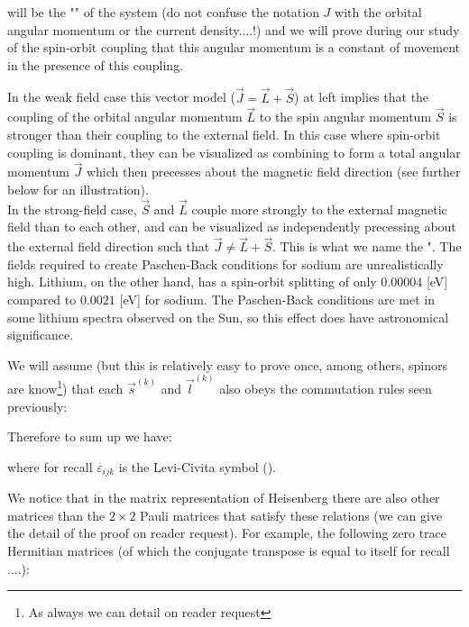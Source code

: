 	will be the "" of the system (do not confuse the notation $J$ with the orbital angular momentum or the current density....!) and we will prove during our study of the spin-orbit coupling that this angular momentum is a constant of movement in the presence of this coupling.
	 \begin{tcolorbox}[title=Remark,colframe=black,arc=10pt]
	In the weak field case this vector model ($\vec{J}=\vec{L}+\vec{S}$) at left implies that the coupling of the orbital angular momentum $\vec{L}$ to the spin angular momentum $\vec{S}$ is stronger than their coupling to the external field. In this case where spin-orbit coupling is dominant, they can be visualized as combining to form a total angular momentum $\vec{J}$ which then precesses about the magnetic field direction (see further below for an illustration).\\
	
	In the strong-field case, $\vec{S}$ and $\vec{L}$ couple more strongly to the external magnetic field than to each other, and can be visualized as independently precessing about the external field direction such that $\vec{J}\neq \vec{L}+\vec{S}$. This is what we name the ". The fields required to create Paschen-Back conditions for sodium are unrealistically high. Lithium, on the other hand, has a spin-orbit splitting of only $0.00004$ [eV] compared to $0.0021$ [eV] for sodium. The Paschen-Back conditions are met in some lithium spectra observed on the Sun, so this effect does have astronomical significance.
	\end{tcolorbox}
	We will assume (but this is relatively easy to prove once, among others, spinors are know\footnote{As always we can detail on reader request}) that each $\vec{s}^{(k)}$ and $\vec{l}^{(k)}$ also obeys the commutation rules seen previously:
	
	Therefore to sum up we have:
	
	where for recall $\varepsilon_{ijk}$ is the Levi-Civita symbol ().
	
	We notice that in the matrix representation of Heisenberg there are also other matrices than the $2\times 2$ Pauli matrices that satisfy these relations (we can give the detail of the proof on reader request). For example, the following zero trace Hermitian matrices (of which the conjugate transpose is equal to itself for recall ....):
	
